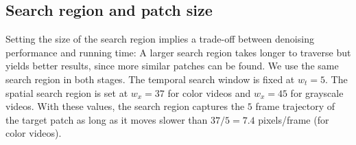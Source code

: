 \documentclass[10pt, a4paper]{article}
\begin{document}



\subsection{Search region and patch size}

Setting the size of the search region implies a trade-off between denoising
performance and running time: A larger search region takes longer to traverse
but yields better results, since more similar patches can be found. We use the same 
search region in both stages. The
temporal search window is fixed at $w_t = 5$. The spatial search region is set at
$w_x = 37$ for color videos and $w_x = 45$ for grayscale videos.
With these values, the search region captures the $5$ frame trajectory of the
target patch as long as it moves slower than $37/5 = 7.4$ pixels/frame (for
color videos).
\end{document}
